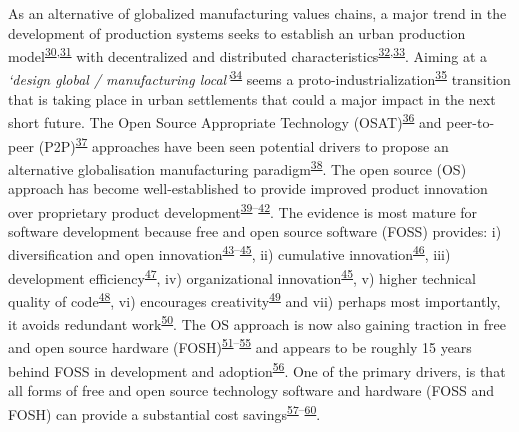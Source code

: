 \documentclass[
  11pt,
  a4paperpaper,
  onecolumn]{article}
\begin{document}
As an alternative of globalized manufacturing values chains, a major
trend in the development of production systems seeks to establish an
urban production
model\textsuperscript{\protect\hyperlink{ref-Herrmann2020}{30},\protect\hyperlink{ref-juraschek2022}{31}}
with decentralized and distributed
characteristics\textsuperscript{\protect\hyperlink{ref-priavolou2022}{32},\protect\hyperlink{ref-cerdas2017}{33}}.
Aiming at a \emph{`design global / manufacturing
local'}\textsuperscript{\protect\hyperlink{ref-Kostakis2018}{34}} seems
a
proto-industrialization\textsuperscript{\protect\hyperlink{ref-sabel1985}{35}}
transition that is taking place in urban settlements that could a major
impact in the next short future. The Open Source Appropriate Technology
(OSAT)\textsuperscript{\protect\hyperlink{ref-Pearce2010}{36}} and
peer-to-peer
(P2P)\textsuperscript{\protect\hyperlink{ref-Kostakis2013}{37}}
approaches have been seen potential drivers to propose an alternative
globalisation manufacturing
paradigm\textsuperscript{\protect\hyperlink{ref-Heikkinen2020a}{38}}.
The open source (OS) approach has become well-established to provide
improved product innovation over proprietary product
development\textsuperscript{\protect\hyperlink{ref-dibona1999}{39}--\protect\hyperlink{ref-deek2007}{42}}.
The evidence is most mature for software development because free and
open source software (FOSS) provides: i) diversification and open
innovation\textsuperscript{\protect\hyperlink{ref-colombo2014}{43}--\protect\hyperlink{ref-alexy2013}{45}},
ii) cumulative
innovation\textsuperscript{\protect\hyperlink{ref-boudreau2016}{46}},
iii) development
efficiency\textsuperscript{\protect\hyperlink{ref-hienerth2014}{47}},
iv) organizational
innovation\textsuperscript{\protect\hyperlink{ref-alexy2013}{45}}, v)
higher technical quality of
code\textsuperscript{\protect\hyperlink{ref-soderberg2015}{48}}, vi)
encourages
creativity\textsuperscript{\protect\hyperlink{ref-martinez2015}{49}} and
vii) perhaps most importantly, it avoids redundant
work\textsuperscript{\protect\hyperlink{ref-Ardal2016}{50}}. The OS
approach is now also gaining traction in free and open source hardware
(FOSH)\textsuperscript{\protect\hyperlink{ref-thompson2011}{51}--\protect\hyperlink{ref-li2018}{55}}
and appears to be roughly 15 years behind FOSS in development and
adoption\textsuperscript{\protect\hyperlink{ref-pearce2018}{56}}. One of
the primary drivers, is that all forms of free and open source
technology software and hardware (FOSS and FOSH) can provide a
substantial cost
savings\textsuperscript{\protect\hyperlink{ref-petch2014}{57}--\protect\hyperlink{ref-wittbrodt2013}{60}}.
\end{document}
